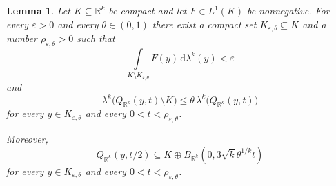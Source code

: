 \documentclass[pdflatex,sn-mathphys-num]{sn-jnl}
\theoremstyle{plain}
\newtheorem{lemma}[theorem]{Lemma}
\theoremstyle{definition}
\newcommand{\dlambda}[1]{\,\mathrm d\lambda^{#1}}
\begin{document}
\begin{lemma}\label{densit}
Let $K\subseteq\mathbb{R}^k$ be compact and let $F\in L^1(K)$ be nonnegative.
For every $\varepsilon>0$ and every $\theta\in(0, 1)$ there exist a compact set
$K_{\varepsilon, \theta}\subseteq K$ and a number
$\rho_{\varepsilon,\theta}>0$ such that
\[
\int\limits_{K\setminus K_{\varepsilon,\theta}}F(y)\dlambda{k}(y)<\varepsilon
\]
and
\[
\lambda^k\big(Q_{\mathbb{R}^k}(y, t)\setminus K\big)\leq \theta\,\lambda^k\big(Q_{\mathbb{R}^k}(y, t)\big)
\]
for every $y\in K_{\varepsilon, \theta}$ and every
$0<t<\rho_{\varepsilon, \theta}$.

Moreover, 
\[
Q_{\mathbb{R}^k}(y, t/2)\subseteq K\oplus B_{\mathbb R^k}(0, 3\sqrt{k}\theta^{1/k}t)
\]
for every $y\in K_{\varepsilon, \theta}$ and every
$0<t<\rho_{\varepsilon, \theta}$.
\end{lemma}
\end{document}
